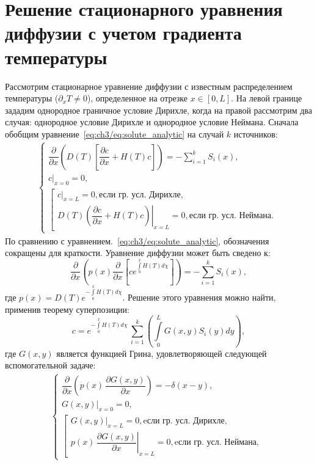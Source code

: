 \chapter{Решение стационарного уравнения диффузии с учетом градиента температуры}\label{app:D}

Рассмотрим стационарное уравнение диффузии с известным распределением температуры ($\partial_x T \neq 0$), определенное на отрезке \( x \in [0, L] \). На левой границе зададим однородное граничное условие Дирихле, когда на правой рассмотрим два случая: однородное условие Дирихле и однородное условие Неймана. Сначала обобщим уравнение~\eqref{eq:ch3/eq:solute_analytic} на случай $k$ источников:
\begin{align}
	\label{eq:general_stat_dif}
	\begin{cases}
		\dfrac{\partial}{\partial x}\left( D(T)\left[ \dfrac{\partial c}{\partial x} + H(T)c\right]\right)=-\sum\limits_{i=1}^k S_i(x), \\[5pt]
		\left.c\right\vert_{x=0}=0,                                                                                                     \\[5pt]
		\left[\begin{array}{ll}
			      \left.c\right\vert_{x=L}=0,  \text{если гр. усл. Дирихле}, \\[5pt]
			      \left.D(T)\left( \dfrac{\partial c}{\partial x} + H(T)c\right)\right\vert_{x=L}=0,  \text{если гр. усл. Неймана}.
		      \end{array}
		\right.
	\end{cases}
\end{align}
По сравнению с уравнением.~\eqref{eq:ch3/eq:solute_analytic}, обозначения сокращены для краткости. Уравнение диффузии может быть сведено к:
\begin{equation}
	\frac{\partial}{\partial x}\left(p(x)\frac{\partial}{\partial x}\left[ ce^{\int\limits_0^x H(T)d\chi}\right]\right)=-\sum\limits_{i=1}^k S_i(x),
\end{equation}
где $p(x)=D(T)e^{-\int\limits_0^x H(T)d\chi}$. Решение этого уравнения можно найти, применив теорему суперпозиции:
\begin{equation}
	\label{eq:ST}
	c=e^{-\int\limits_0^x H(T)d\chi}\,\sum\limits_{i=1}^k \left( \int\limits_0^L G(x,y)S_i(y)dy \right),
\end{equation}
где $G(x,y)$ является функцией Грина, удовлетворяющей следующей вспомогательной задаче:
\begin{align}
	\label{eq:Green_problem}
	\begin{cases}
		\dfrac{\partial}{\partial x}\left(p(x)\,\dfrac{\partial G(x,y)}{\partial x}\right)=-\delta(x-y), \\[5pt]
		\left.G(x,y)\right\vert_{x=0}=0,                                                                 \\[5pt]
		\left[\begin{array}{ll}
			      \left.G(x,y)\right\vert_{x=L}=0,  \text{eсли гр. усл. Дирихле}, \\[5pt]
			      \left.p(x)\,\dfrac{\partial G(x,y)}{\partial x}\right\vert_{x=L}=0,  \text{eсли гр. усл. Неймана},
		      \end{array}\right.
	\end{cases}
\end{align}

